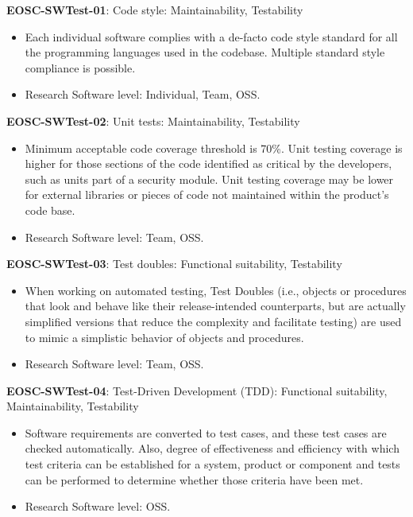 \textbf{EOSC-SWTest-01}: Code style: Maintainability, Testability

\begin{itemize}
    \item Each individual software complies with a de-facto code style standard for all the programming languages used in the codebase. Multiple standard style compliance is possible.~\cite{orviz_set_2017,raymond_software_2013}
    \item Research Software level: Individual, Team, OSS.
\end{itemize}

\textbf{EOSC-SWTest-02}: Unit tests: Maintainability, Testability

\begin{itemize}
    \item Minimum acceptable code coverage threshold is 70\%. Unit testing coverage is higher for those sections of the code identified as critical by the developers, such as units part of a security module. Unit testing coverage may be lower for external libraries or pieces of code not maintained within the product's code base.~\cite{aberdour_achieving_2007,nagappan_early_2005,boehm_quantitative_1976,shepherdson_cessda_2019,orviz_set_2017,raymond_software_2013}
    \item Research Software level: Team, OSS.
\end{itemize}

\textbf{EOSC-SWTest-03}: Test doubles: Functional suitability, Testability

\begin{itemize}
    \item When working on automated testing,  Test Doubles (i.e., objects or procedures that look and behave like their release-intended 
counterparts, but are actually simplified versions that reduce the 
complexity and facilitate testing) are used to mimic a simplistic behavior of objects and procedures.~\cite{orviz_set_2017,orviz_fernandez_eosc-synergy_2020}
    \item Research Software level: Team, OSS.
\end{itemize}

\textbf{EOSC-SWTest-04}: Test-Driven Development (TDD): Functional suitability, Maintainability, Testability

\begin{itemize}
    \item Software requirements are converted to test cases, and these test cases are checked automatically. Also, degree of effectiveness and efficiency with which test criteria can be established for a system, product or
component and tests can be performed to determine whether those criteria have been met.~\cite{iso_25010_2011_2017,crispin_driving_2006,zuser_software_2005,orviz_set_2017}
    \item Research Software level: OSS.
\end{itemize}

